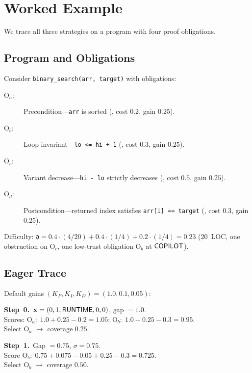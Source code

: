 \documentclass[11pt]{article}
\newcommand{\xstate}{\mathbf{x}}           %
\newcommand{\vint}{\sigma}                 %
\newcommand{\Kp}{K_P}                      %
\newcommand{\Ki}{K_I}                      %
\newcommand{\Kd}{K_D}                      %
\newcommand{\difficulty}{\mathfrak{d}}     %
\begin{document}
\section{Worked Example}
\label{sec:example}

We trace all three strategies on a program with four proof obligations.

\subsection{Program and Obligations}

Consider \texttt{binary\_search(arr, target)} with obligations:
\begin{description}
  \item[$\mathrm{O}_a$:] Precondition---\texttt{arr} is sorted
        (\VERIFY, cost $0.2$, gain $0.25$).
  \item[$\mathrm{O}_b$:] Loop invariant---\texttt{lo <= hi + 1}
        (\VERIFY, cost $0.3$, gain $0.25$).
  \item[$\mathrm{O}_c$:] Variant decrease---\texttt{hi - lo} strictly
        decreases (\CONSTRUCT, cost $0.5$, gain $0.25$).
  \item[$\mathrm{O}_d$:] Postcondition---returned index satisfies
        \texttt{arr[i] == target} (\VERIFY, cost $0.3$, gain $0.25$).
\end{description}

\noindent
Difficulty: $\difficulty = 0.4 \cdot (4/20) + 0.4 \cdot (1/4)
+ 0.2 \cdot (1/4) = 0.23$ (20~LOC, one obstruction on
$\mathrm{O}_c$, one low-trust obligation $\mathrm{O}_b$ at
$\mathsf{COPILOT}$).

\subsection{Eager Trace}

Default gains $(\Kp, \Ki, \Kd) = (1.0, 0.1, 0.05)$:

\medskip\noindent
\textbf{Step~0.}\ $\xstate = (0, 1, \Truntime, 0, 0)$, gap $= 1.0$. \\
Scores: $\mathrm{O}_a{:}\; 1.0 + 0.25 - 0.2 = 1.05$;\quad
$\mathrm{O}_b{:}\; 1.0 + 0.25 - 0.3 = 0.95$. \\
Select $\mathrm{O}_a$ $\to$ coverage $0.25$.

\smallskip\noindent
\textbf{Step~1.}\ Gap $= 0.75$, $\vint = 0.75$. \\
Score $\mathrm{O}_b{:}\; 0.75 + 0.075 - 0.05 + 0.25 - 0.3 = 0.725$. \\
Select $\mathrm{O}_b$ $\to$ coverage $0.50$.
\end{document}
